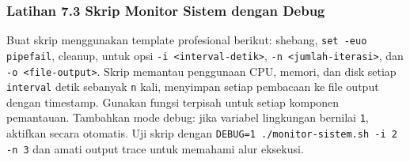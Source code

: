 \subsubsection*{Latihan 7.3 Skrip Monitor Sistem dengan Debug}
Buat skrip  menggunakan template profesional
berikut: shebang, \texttt{set -euo pipefail},  cleanup,
 untuk opsi \texttt{-i <interval-detik>}, \texttt{-n
<jumlah-iterasi>}, dan \texttt{-o <file-output>}. Skrip memantau
penggunaan CPU, memori, dan disk setiap \texttt{interval} detik sebanyak
\texttt{n} kali, menyimpan setiap pembacaan ke file output dengan
timestamp. Gunakan fungsi terpisah untuk setiap komponen pemantauan.
Tambahkan mode debug: jika variabel lingkungan  bernilai
\texttt{1}, aktifkan  secara otomatis. Uji skrip dengan
\texttt{DEBUG=1 ./monitor-sistem.sh -i 2 -n 3} dan amati output trace
untuk memahami alur eksekusi.


%
